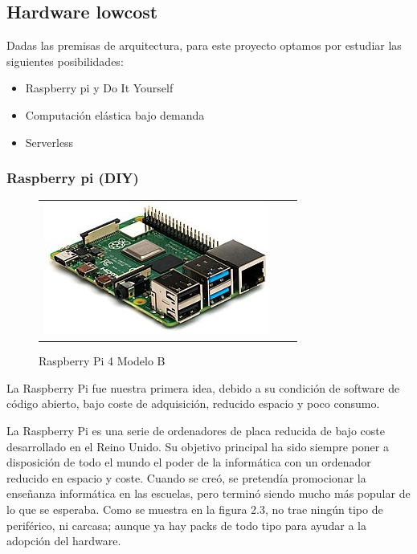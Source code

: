 \subsection{Hardware lowcost}
Dadas las premisas de arquitectura, para este proyecto optamos por estudiar las siguientes posibilidades:
\begin{itemize}
    \item Raspberry pi y Do It Yourself
    \item Computación elástica bajo demanda
    \item Serverless
\end{itemize}
\subsubsection{Raspberry pi (DIY)}
\begin{figure}[h]
\centering
\begin{tabular}{ccc}
\includegraphics[scale=0.5]{archivos/RPi_4.jpg}
\end{tabular}
\caption{Raspberry Pi 4 Modelo B}
\label{fig:rpi4}
\end{figure}
\vspace{1em}
\par La Raspberry Pi fue nuestra primera idea, debido a su condición de software de código abierto, bajo coste de adquisición, reducido espacio y poco consumo.
\vspace{1em}
\par La Raspberry Pi es una serie de ordenadores de placa reducida de bajo coste desarrollado en el Reino Unido. Su objetivo principal ha sido siempre poner a disposición de todo el mundo el poder de la informática con un ordenador reducido en espacio y coste. Cuando se creó, se pretendía promocionar la enseñanza informática en las escuelas, pero terminó siendo mucho más popular de lo que se esperaba. Como se muestra en la figura 2.3, no trae ningún tipo de periférico, ni carcasa; aunque ya hay packs de todo tipo para ayudar a la adopción del hardware.
